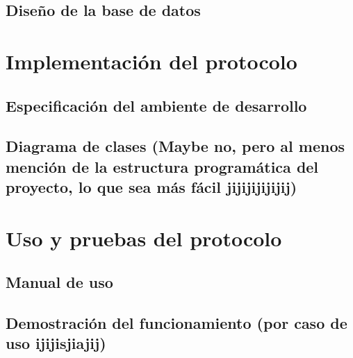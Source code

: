 \documentclass[12pt]{article}
\begin{document}
\subsection{Diseño de la base de datos}

\section{Implementación del protocolo}
\subsection{Especificación del ambiente de desarrollo}
\subsection{Diagrama de clases (Maybe no, pero al menos mención de la estructura programática del proyecto, lo que sea más fácil jijijijijijij)}

\section{Uso y pruebas del protocolo}
\subsection{Manual de uso}
\subsection{Demostración del funcionamiento (por caso de uso ijijisjiajij)}
\end{document}
